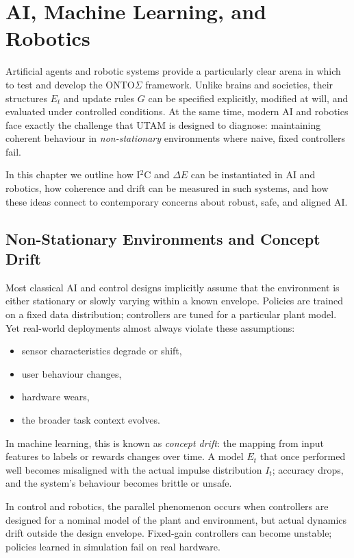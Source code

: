\documentclass[12pt,a4paper]{report}
\begin{document}
\chapter{AI, Machine Learning, and Robotics}

Artificial agents and robotic systems provide a particularly clear arena in which to test and develop the ONTO$\Sigma$ framework. Unlike brains and societies, their structures \(E_t\) and update rules \(G\) can be specified explicitly, modified at will, and evaluated under controlled conditions. At the same time, modern AI and robotics face exactly the challenge that UTAM is designed to diagnose: maintaining coherent behaviour in \emph{non-stationary} environments where naive, fixed controllers fail.

In this chapter we outline how I$^2$C and $\Delta E$ can be instantiated in AI and robotics, how coherence and drift can be measured in such systems, and how these ideas connect to contemporary concerns about robust, safe, and aligned AI.

\section{Non-Stationary Environments and Concept Drift}

Most classical AI and control designs implicitly assume that the environment is either stationary or slowly varying within a known envelope. Policies are trained on a fixed data distribution; controllers are tuned for a particular plant model. Yet real-world deployments almost always violate these assumptions:

\begin{itemize}[leftmargin=2em]
    \item sensor characteristics degrade or shift,
    \item user behaviour changes,
    \item hardware wears,
    \item the broader task context evolves.
\end{itemize}

In machine learning, this is known as \emph{concept drift}: the mapping from input features to labels or rewards changes over time. A model \(E_t\) that once performed well becomes misaligned with the actual impulse distribution \(I_t\); accuracy drops, and the system's behaviour becomes brittle or unsafe.

In control and robotics, the parallel phenomenon occurs when controllers are designed for a nominal model of the plant and environment, but actual dynamics drift outside the design envelope. Fixed-gain controllers can become unstable; policies learned in simulation fail on real hardware.
\end{document}
